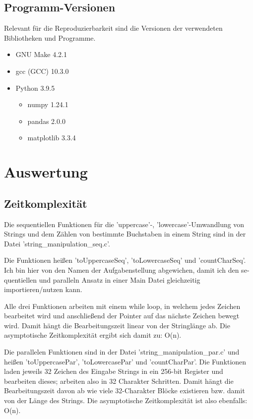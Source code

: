 \documentclass[plainarticle,zihtitle,german,final,hyperref,utf8]{zihpub}
\begin{document}
\subsection{Programm-Versionen}
Relevant für die Reproduzierbarkeit sind die Versionen der verwendeten Bibliotheken und Programme.
\begin{itemize}
	\item GNU Make 4.2.1
	\item gcc (GCC) 10.3.0
	\item Python 3.9.5
	\begin{itemize}
		\item numpy 1.24.1
		\item pandas 2.0.0
		\item matplotlib 3.3.4
	\end{itemize}
\end{itemize}

\section{Auswertung}
\subsection{Zeitkomplexität}
Die se­quen­ti­ellen Funktionen für die 'uppercase'-, 'lowercase'-Umwandlung von Strings und dem Zählen von bestimmte Buchstaben in einem String sind in der Datei 'string\_manipulation\_seq.c'.

Die Funktionen heißen 'toUppercaseSeq', 'toLowercaseSeq' und 'countCharSeq'. Ich bin hier von den Namen der Aufgabenstellung abgewichen, damit ich den se­quen­ti­ellen und paralleln Ansatz in einer Main Datei gleichzeitig importieren/nutzen kann.

Alle drei Funktionen arbeiten mit einem while loop, in welchem jedes Zeichen bearbeitet wird und anschließend der Pointer auf das nächste Zeichen bewegt wird. Damit hängt die Bearbeitungszeit linear von der Stringlänge ab. Die asymptotische Zeitkomplexität ergibt sich damit zu: O(n).
\newline

Die parallelen Funktionen sind in der Datei 'string\_manipulation\_par.c' und heißen 'toUppercasePar', 'toLowercasePar' und 'countCharPar'.
Die Funktionen laden jeweils 32 Zeichen des Eingabe Strings in ein 256-bit Register und bearbeiten dieses; arbeiten also in 32 Charakter Schritten.
Damit hängt die Bearbeitungszeit davon ab wie viele 32-Charakter Blöcke existieren bzw. damit von der Länge des Strings. Die asymptotische Zeitkomplexität ist also ebenfalls: O(n).
\newline
\end{document}
